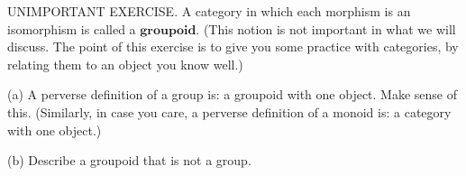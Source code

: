 UNIMPORTANT EXERCISE. A category in which each morphism is an isomorphism is called a $\textbf{groupoid}$. (This notion is not important in what we will discuss. The point of this exercise is to give you some practice with categories, by relating them to an object you know well.)

(a) A perverse deﬁnition of a group is: a groupoid with one object. Make sense of this. (Similarly, in case you care, a perverse deﬁnition of a monoid is: a category with one object.)

(b) Describe a groupoid that is not a group.